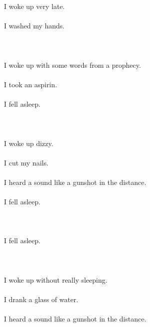 \documentclass{article}
\begin{document}
    
    \section{}
    I woke up very late.\\\\I washed my hands.\\\\ 
    \newpage
    
    \section{}
    I woke up with some words from a prophecy.\\\\I took an aspirin.\\\\I fell asleep.\\\\ 
    \newpage
    
    \section{}
    I woke up dizzy.\\\\I cut my nails.\\\\I heard a sound like a gunshot in the distance.\\\\I fell asleep.\\\\ 
    \newpage
    
    \section{}
    I fell asleep.\\\\ 
    \newpage
    
    \section{}
    I woke up without really sleeping.\\\\I drank a glass of water.\\\\I heard a sound like a gunshot in the distance.\\\\ 
    \newpage
    
\end{document}

